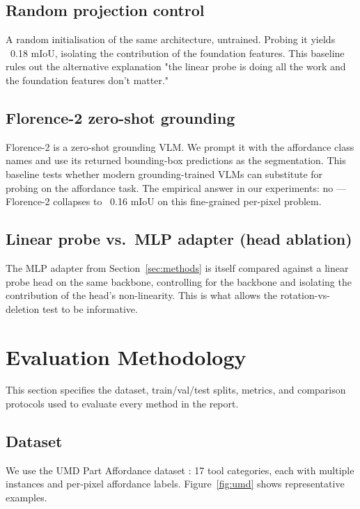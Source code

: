\documentclass[11pt]{article}
\begin{document}
\subsection{Random projection control}

A random initialisation of the same architecture, untrained. Probing it
yields ~0.18 mIoU, isolating the contribution of the foundation
features. This baseline rules out the alternative explanation "the
linear probe is doing all the work and the foundation features don't
matter."

\subsection{Florence-2 zero-shot grounding}

Florence-2 \cite{xiao2024florence2} is a zero-shot grounding VLM. We
prompt it with the affordance class names and use its returned
bounding-box predictions as the segmentation. This baseline tests
whether modern grounding-trained VLMs can substitute for probing on the
affordance task. The empirical answer in our experiments: no ---
Florence-2 collapses to ~0.16 mIoU on this fine-grained per-pixel
problem.

\subsection{Linear probe vs.\ MLP adapter (head ablation)}

The MLP adapter from Section~\ref{sec:methods} is itself compared
against a linear probe head on the same backbone, controlling for the
backbone and isolating the contribution of the head's non-linearity.
This is what allows the rotation-vs-deletion test to be informative.

\section{Evaluation Methodology}
\label{sec:evaluation}

This section specifies the dataset, train/val/test splits, metrics, and
comparison protocols used to evaluate every method in the report.

\subsection{Dataset}

We use the UMD Part Affordance dataset \cite{myers2015umd}: 17 tool
categories, each with multiple instances and per-pixel affordance
labels. Figure~\ref{fig:umd} shows representative examples.
\end{document}
